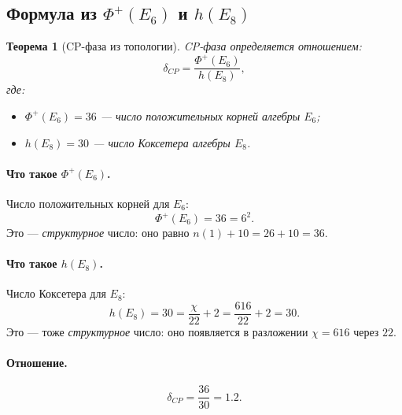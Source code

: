 \documentclass[11pt,a4paper]{article}
\newtheorem{theorem}{Теорема}[section]
\theoremstyle{definition}
\begin{document}
\subsection{Формула из $\Phi^+(E_6)$ и $h(E_8)$}
\label{subsec:cp-formula}

\begin{theorem}[CP-фаза из топологии]
\label{thm:cp-topology}
CP-фаза определяется отношением:
\begin{equation}
    \delta_{CP} = \frac{\Phi^+(E_6)}{h(E_8)},
\end{equation}
где:
\begin{itemize}
    \item $\Phi^+(E_6) = 36$ — число \emph{положительных корней} 
          алгебры $E_6$;
    \item $h(E_8) = 30$ — \emph{число Коксетера} алгебры $E_8$.
\end{itemize}
\end{theorem}

\paragraph{Что такое $\Phi^+(E_6)$.}
Число положительных корней для $E_6$:
\begin{equation}
    \Phi^+(E_6) = 36 = 6^2.
\end{equation}
Это — \emph{структурное} число: оно равно $n(1) + 10 = 26 + 10 = 36$.

\paragraph{Что такое $h(E_8)$.}
Число Коксетера для $E_8$:
\begin{equation}
    h(E_8) = 30 = \frac{\chi}{22} + 2 = \frac{616}{22} + 2 = 30.
\end{equation}
Это — тоже \emph{структурное} число: оно появляется в разложении 
$\chi = 616$ через $22$.

\paragraph{Отношение.}
\begin{equation}
    \boxed{
    \delta_{CP} = \frac{36}{30} = 1.2.
    }
\end{equation}
\end{document}

